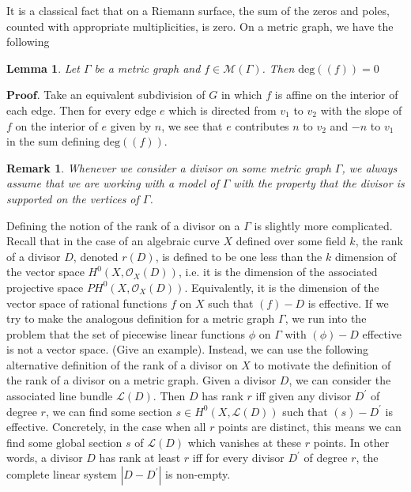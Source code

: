 \documentclass{article}
\newtheorem{lemma}[theorem]{Lemma}
\newtheorem{remark}{Remark}[section]
\begin{document}
\newline
\newline
It is a classical fact that on a Riemann surface, the sum of the zeros and poles, counted with appropriate multiplicities, is zero. On a metric graph, we have the following
\begin{lemma}
Let $\Gamma$ be a metric graph and $f\in \mathcal{M}(\Gamma)$. Then $\text{deg}((f)) = 0$
\end{lemma}
$\textbf{Proof.}$ Take an equivalent subdivision of $G$ in which $f$ is affine on the interior of each edge. Then for every edge $e$ which is directed from $v_1$ to $v_2$ with the slope of $f$ on the interior of $e$ given by $n$, we see that $e$ contributes $n$ to $v_2$ and $-n$ to $v_1$ in the sum defining $\text{deg}((f))$. 
\begin{remark}
Whenever we consider a divisor on some metric graph $\Gamma$, we always assume that we are working with a model of $\Gamma$ with the property that the divisor is supported on the vertices of $\Gamma$. 
\end{remark}
Defining the notion of the rank of a divisor on a $\Gamma$ is slightly more complicated. Recall that in the case of an algebraic curve $X$ defined over some field $k$, the rank of a divisor $D$, denoted $r(D)$, is defined to be one less than the $k$ dimension of the vector space $H^{0}(X, \mathcal{O}_X(D))$, i.e. it is the dimension of the associated projective space $PH^{0}(X, \mathcal{O}_X(D))$. Equivalently, it is the dimension of the vector space of rational functions $f$ on $X$ such that $(f) - D$ is effective. If we try to make the analogous definition for a metric graph $\Gamma$, we run into the problem that the set of piecewise linear functions $\phi$ on $\Gamma$ with $(\phi) - D$ effective is not a vector space. (Give an example). Instead, we can use the following alternative definition of the rank of a divisor on $X$ to motivate the definition of the rank of a divisor on a metric graph. Given a divisor $D$, we can consider the associated line bundle $\mathcal{L}(D)$. Then $D$ has rank $r$ iff given any divisor $D^{\prime}$ of degree $r$, we can find some section $s\in H^{0}(X, \mathcal{L}(D))$ such that $(s) - D^{\prime}$ is effective. Concretely, in the case when all $r$ points are distinct, this means we can find some global section $s$ of $\mathcal{L}(D)$ which vanishes at these $r$ points. In other words, a divisor $D$ has rank at least $r$ iff for every divisor $D^{\prime}$ of degree $r$, the complete linear system $|D - D^{\prime}|$ is non-empty. 
\newline
\end{document}
